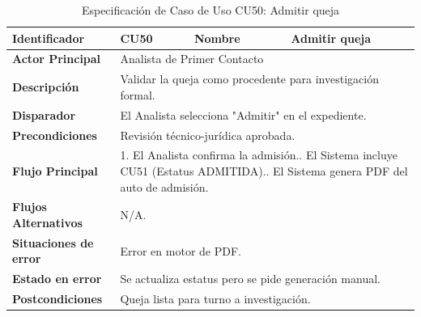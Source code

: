 \begingroup
\setlength{\parskip}{0pt}
\begin{longtable}{|p{3.5cm}|p{2cm}|p{2.5cm}|p{7cm}|}
\caption{Especificación de Caso de Uso CU50: Admitir queja}
\label{tab:cu50} \\
\hline
\textbf{Identificador} & CU50 & \textbf{Nombre} & Admitir queja \\ \hline
\textbf{Actor Principal} & \multicolumn{3}{p{11.5cm}|}{Analista de Primer Contacto} \\ \hline
\textbf{Descripción} & \multicolumn{3}{p{11.5cm}|}{Validar la queja como procedente para investigación formal.} \\ \hline
\textbf{Disparador} & \multicolumn{3}{p{11.5cm}|}{El Analista selecciona "Admitir" en el expediente.} \\ \hline
\textbf{Precondiciones} & \multicolumn{3}{p{11.5cm}|}{Revisión técnico-jurídica aprobada.} \\ \hline
\textbf{Flujo Principal} & \multicolumn{3}{p{11.5cm}|}{1. El Analista confirma la admisión.\newline 2. El Sistema incluye CU51 (Estatus ADMITIDA).\newline 3. El Sistema genera PDF del auto de admisión.} \\ \hline
\textbf{Flujos Alternativos} & \multicolumn{3}{p{11.5cm}|}{N/A.} \\ \hline
\textbf{Situaciones de error} & \multicolumn{3}{p{11.5cm}|}{Error en motor de PDF.} \\ \hline
\textbf{Estado en error} & \multicolumn{3}{p{11.5cm}|}{Se actualiza estatus pero se pide generación manual.} \\ \hline
\textbf{Postcondiciones} & \multicolumn{3}{p{11.5cm}|}{Queja lista para turno a investigación.} \\ \hline
\end{longtable}
\endgroup

\vspace{0.8cm}

